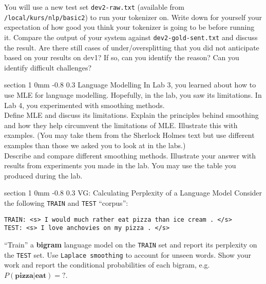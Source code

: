 \documentclass[11pt]{article}
\makeatletter
\renewcommand{\section}{\@startsection
{section}%
{1}%
{0mm}%
{-0.8\baselineskip}%
{0.3\baselineskip}%
{\bfseries\large}}%
\makeatother
\begin{document}
You will use a new test set {\tt dev2-raw.txt} (available from {\tt
  /local/kurs/nlp/basic2}) to run your tokenizer on. Write down for
yourself your expectation of how good you think your tokenizer is
going to be before running it.  Compare the output of your system
against {\tt dev2-gold-sent.txt} and discuss the result. Are there
still cases of under/oversplitting that you did not anticipate based 
on your results on dev1? If so, can you identify the
reason? Can you identify difficult challenges?

\section{Language Modelling}
\indent In Lab 3, you learned about how to use MLE for language modelling.
Hopefully, in the lab, you saw its limitations. 
In Lab 4, you experimented with smoothing methods.\\
\indent Define MLE and discuss its limitations. Explain the principles behind
smoothing and how they help circumvent the limitations of MLE. Illustrate this
with examples. (You may take them from the Sherlock Holmes text but use
different examples than those we asked you to look at in the labs.)\\
\indent Describe and compare different smoothing methods.  Illustrate your
answer with results from experiments you made in the lab. You may use the table
you produced during the lab.

\section{VG: Calculating Perplexity of a Language Model}
Consider the following \texttt{TRAIN} and \texttt{TEST} ``corpus'':

\begin{verbatim}
TRAIN: <s> I would much rather eat pizza than ice cream . </s>
TEST: <s> I love anchovies on my pizza . </s>
\end{verbatim}

``Train'' a \textbf{bigram} language model on the \texttt{TRAIN} set and report
its perplexity on the \texttt{TEST} set. Use \texttt{Laplace smoothing} to
account for unseen words. Show your work and report the conditional
probabilities of each bigram, e.g. $P(\mathbf{pizza}|\mathbf{eat}) = ?$.
\end{document}
